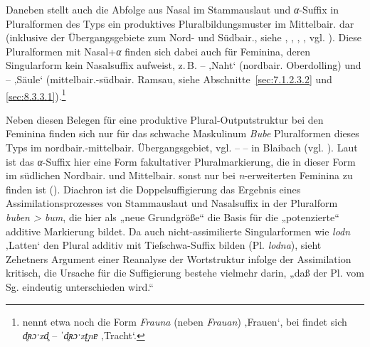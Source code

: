 Daneben stellt auch die Abfolge aus Nasal im Stammauslaut und \textit{α}{}-Suffix in Pluralformen des Typs  ein produktives Pluralbildungsmuster im Mittelbair. dar (inklusive der Übergangsgebiete zum Nord- und Südbair., siehe \citealt[166]{Mauser1998a}, \citealt[425]{Rowley1990b}, \citealt[128 und 160]{Rowley1997}, \citealt[58]{SMF7}, vgl. \citealt[§46h12]{Kranzmayer1956}). Diese Pluralformen mit Nasal+\textit{α} finden sich dabei auch für Feminina, deren Singularform kein Nasalsuffix aufweist, z.\,B.  --  ‚Naht‘ (nordbair. Oberdolling) und  --  ‚Säule‘ (mittelbair.-südbair. Ramsau, siehe Abschnitte~\ref{sec:7.1.2.3.2} und \ref{sec:8.3.3.1}).\footnote{\citet[117]{Zehetner1985} nennt etwa noch die Form \textit{Frauna} (neben \textit{Frauan}) ‚Frauen‘, bei \citet[166]{Mauser2000} findet sich \textit{d̥ʀɔˑxd̥} -- \textit{ˈd̥ʀɔˑxt̺nɐ} ‚Tracht‘.}

Neben diesen Belegen für eine produktive Plural-Outputstruktur bei den Feminina finden sich nur für das schwache Maskulinum \textit{Bube} Pluralformen dieses Typs im nordbair.-mittelbair. Übergangsgebiet, vgl.  --  --   in Blaibach (vgl. \citealt[§38]{Kollmer1985}). Laut \citet[138]{Rowley1997} ist das \textit{α}{}-Suffix hier eine Form fakultativer Pluralmarkierung, die in dieser Form im südlichen Nordbair. und Mittelbair. sonst nur bei \textit{n}{}-erweiterten Feminina zu finden ist (). Diachron ist die Doppelsuffigierung das Ergebnis eines Assimilationsprozesses von Stammauslaut und Nasalsuffix in der Pluralform \textit{buben > bum}, die hier als „neue Grundgröße“ \citep[192]{Zehetner1978} die Basis für die „potenzierte“ additive Markierung bildet. Da auch nicht-assimilierte Singularformen wie \textit{lodn} ‚Latten‘ den Plural additiv mit Tiefschwa-Suffix bilden (Pl. \textit{lodna}), sieht \citet[123]{Steininger1994} Zehetners Argument einer Reanalyse der Wortstruktur infolge der Assimilation kritisch, die Ursache für die Suffigierung bestehe vielmehr darin, „daß der Pl. vom Sg. eindeutig unterschieden wird.“

